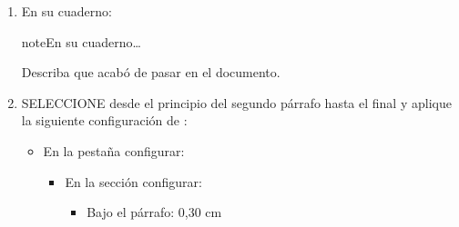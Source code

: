 \documentclass[letterpaper,10pt,spanish]{sphinxmanual}
\let\sphinxpxdimen\pdfpxdimen\else\newdimen\sphinxpxdimen
\begin{document}
\begin{enumerate}
\begin{savenotes}
\begin{tabulary}{\linewidth}[t]{T}
\begin{sphinxfigure-in-table}
\noindent\sphinxincludegraphics[width=650\sphinxpxdimen]{{image123}.png}
\end{sphinxfigure-in-table}\relax
\\
\sphinxbottomrule
\end{tabulary}
\sphinxtableafterendhook\par
\sphinxattableend\end{savenotes}
\begin{itemize}
\item {} 
\sphinxAtStartPar
En la pestaña  configurar:
\begin{itemize}
\item {} 
\sphinxAtStartPar
En la sección  configurar:
\begin{itemize}
\item {} 
\sphinxAtStartPar
Bajo el párrafo: 0,30 cm

\end{itemize}

\item {} 
\sphinxAtStartPar
En la sección  configurar:
\begin{itemize}
\item {} 
\sphinxAtStartPar
{} de 

\end{itemize}

\end{itemize}

\item {} 
\sphinxAtStartPar
PULSE el botón 

\end{itemize}

\item {} 
\sphinxAtStartPar
En su cuaderno:

\begin{sphinxadmonition}{note}{En su cuaderno…}

\sphinxAtStartPar
Describa que acabó de pasar en el documento.
\end{sphinxadmonition}

\item {} 
\sphinxAtStartPar
SELECCIONE desde el principio del segundo párrafo hasta el final y aplique la siguiente configuración de :
\begin{itemize}
\item {} 
\sphinxAtStartPar
En la pestaña  configurar:
\begin{itemize}
\item {} 
\sphinxAtStartPar
En la sección  configurar:
\begin{itemize}
\item {} 
\sphinxAtStartPar
Bajo el párrafo: 0,30 cm


\end{itemize}
\end{itemize}
\end{itemize}
\end{enumerate}
\end{document}
